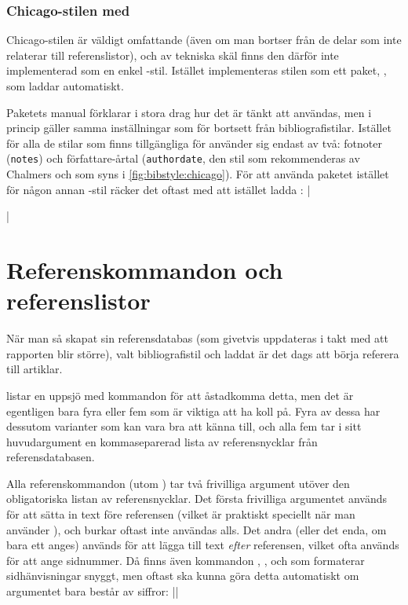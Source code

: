 \documentclass[10pt,../../a4.tex]{subfiles}
\begin{document}
\subsubsection{Chicago-stilen med }
Chicago-stilen \parencite{Chicago10} är väldigt omfattande (även om man
bortser från de delar som inte relaterar till referenslistor), och av
tekniska skäl finns den därför inte implementerad som en enkel
-stil. Istället implementeras stilen som ett paket,
, som laddar  automatiskt.

Paketets manual \parencite{Fussner13} förklarar i stora drag hur det
är tänkt att användas, men i princip gäller samma inställningar som
för  bortsett från bibliografistilar. Istället för alla
de stilar som finns tillgängliga för  använder sig
 endast av två: fotnoter (\texttt{notes})
och författare-årtal (\texttt{authordate}, den stil som rekommenderas
av Chalmers och som syns i \cref{fig:bibstyle:chicago}).
För att använda paketet istället för någon annan -stil
räcker det oftast med att istället ladda :
\latex|\usepackage[authordate,backend=biber]{biblatex-chicago}|

\section{Referenskommandon och referenslistor}
När man så skapat sin referensdatabas (som givetvis uppdateras i takt med
att rapporten blir större), valt bibliografistil och laddat
 är det dags att börja referera till artiklar.

\Textcite[\ppno~79\psqq]{Lehman13} listar en uppsjö med kommandon för att
åstadkomma detta, men det är egentligen bara fyra eller fem som är viktiga
att ha koll på. Fyra av dessa har dessutom varianter som kan vara bra att
känna till, och alla fem tar i sitt huvudargument en kommaseparerad lista
av referensnycklar från referensdatabasen.

Alla referenskommandon (utom ) tar två frivilliga argument
utöver den obligatoriska listan av referensnycklar. Det första frivilliga
argumentet används för att sätta in text före referensen (vilket är
praktiskt speciellt när man använder ), och burkar oftast
inte användas alls. Det andra (eller det enda, om bara ett anges) används
för att lägga till text \emph{efter} referensen, vilket ofta används för
att ange sidnummer. Då finns även kommandon , ,
 och  som formaterar sidhänvisningar snyggt, men oftast
ska  kunna göra detta automatiskt om argumentet bara består
av siffror:
\latex|\parencite[12-14]{Lehman13}|
\end{document}
